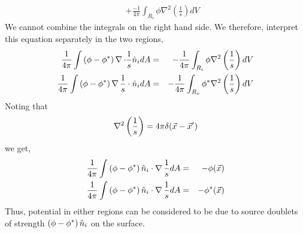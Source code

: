 \begin{enumerate}
\begin{itemize}
\begin{eqnarray*}
 & & + \frac{-1}{4\pi}\int_{R_i}\phi\nabla^2\left(\frac{1}{s}\right)dV
\end{eqnarray*}
We cannot combine the integrals on the right hand side. We therefore, interpret this equation separately in the two regions,
\begin{eqnarray*}
\frac{1}{4\pi}\int \left(\phi - \phi^\ast\right)\operatorname{\nabla}\cdot\frac{1}{s}\hat{n}_i dA &=& -\frac{1}{4\pi}\int_{R_i}\phi\nabla^2\left(\frac{1}{s}\right)dV \\
\frac{1}{4\pi}\int \left(\phi - \phi^\ast\right)\operatorname{\nabla}\frac{1}{s}\cdot\hat{n}_i dA &=& -\frac{1}{4\pi}\int_{R_o}\phi^\ast\nabla^2\left(\frac{1}{s}\right)dV
\end{eqnarray*}
Noting that 
\[
\nabla^2\left(\frac{1}{s}\right) = 4\pi\delta(\vec{x} - \vec{x}^\prime)
\]
we get,
\begin{eqnarray*}
\frac{1}{4\pi}\int \left(\phi - \phi^\ast\right)\hat{n}_i\cdot\operatorname{\nabla}\frac{1}{s} dA &=& -\phi(\vec{x}) \\
\frac{1}{4\pi}\int \left(\phi - \phi^\ast\right)\hat{n}_i\cdot\operatorname{\nabla}\frac{1}{s} dA &=& -\phi^\ast(\vec{x})
\end{eqnarray*}
Thus, potential in either regions can be considered to be due to source doublets of strength $\left(\phi - \phi^\ast\right)\hat{n}_i$ on the surface.
\end{itemize}


\end{enumerate}
